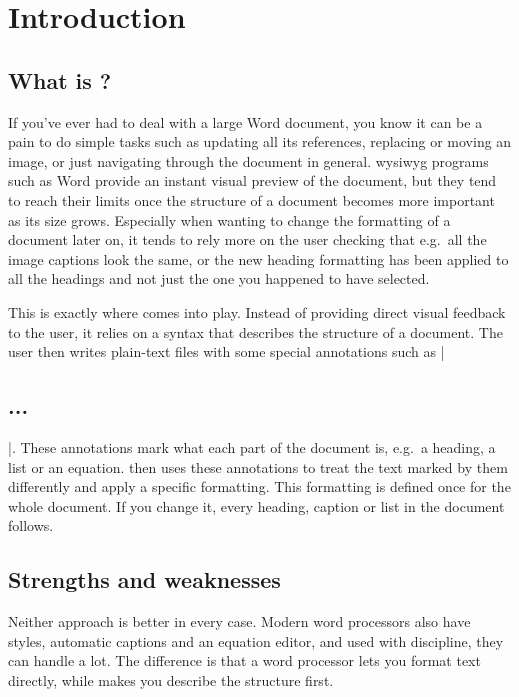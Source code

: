 \chapter{Introduction}\label{chap:introduction}

\section{What is ?}\label{sec:what-is-latex}

If you've ever had to deal with a large Word document, you know it can be a pain to do simple tasks such as updating all its references, replacing or moving an image, or just navigating through the document in general.
\Gls{wysiwyg} programs such as Word provide an instant visual preview of the document,
but they tend to reach their limits once the structure of a document becomes more important as its size grows.
Especially when wanting to change the formatting of a document later on,
it tends to rely more on the user checking that e.g.\ all the image captions look the same,
or the new heading formatting has been applied to all the headings and not just the one you happened to have selected.

This is exactly where  comes into play.
Instead of providing direct visual feedback to the user, it relies on a syntax that describes the structure of a document.
The user then writes plain-text files with some special annotations such as \code|\section{...}|.
These annotations mark what each part of the document is, e.g.\ a heading, a list or an equation.
 then uses these annotations to treat the text marked by them differently and apply a specific formatting.
This formatting is defined once for the whole document.
If you change it, every heading, caption or list in the document follows.

\section{Strengths and weaknesses}\label{sec:strengths-weaknesses}

Neither approach is better in every case.
Modern word processors also have styles, automatic captions and an equation editor,
and used with discipline, they can handle a lot.
The difference is that a word processor lets you format text directly,
while  makes you describe the structure first.

